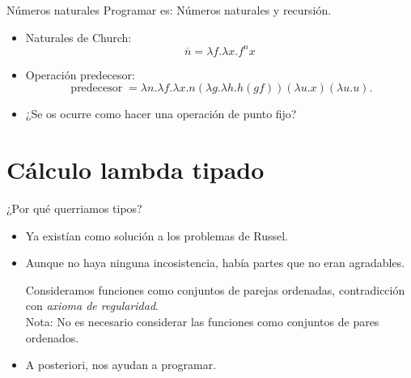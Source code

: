 \documentclass[usenames,dvipsnames]{beamer}
\begin{document}
\begin{frame}{Números naturales}
  Programar es: Números naturales y recursión.
  \begin{itemize}
  \item Naturales de Church:
    $$\overline n = \lambda f.\lambda x. f^n x$$
  \item Operación predecesor:
    $$\operatorname{predecesor} =\lambda n.\lambda f.\lambda x. n (\lambda g.\lambda h. h (g f)) (\lambda u.x) (\lambda u.u). $$
  \item ¿Se os ocurre como hacer una operación de punto fijo?
  \end{itemize}
\end{frame}



\section{Cálculo lambda tipado}
\begin{frame}{¿Por qué querriamos tipos?}
  \begin{itemize}
  \item Ya existían como solución a los problemas de Russel.
  \item Aunque no haya ninguna incosistencia, había partes que no eran agradables.
    \begin{example}
      Consideramos funciones como conjuntos de parejas ordenadas, contradicción con \emph{axioma de regularidad}. \\
       Nota: No es necesario considerar las funciones como conjuntos de pares ordenados.
    \end{example}

  \item A posteriori, nos ayudan a programar. 
  \end{itemize}
\end{frame}
\end{document}
